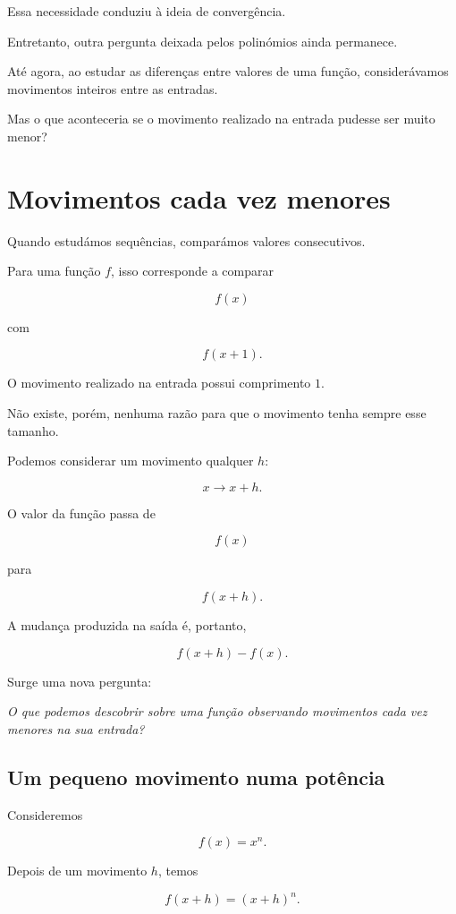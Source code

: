 \documentclass[12pt,a4paper]{article}
\begin{document}
Essa necessidade conduziu à ideia de convergência.

Entretanto, outra pergunta deixada pelos polinómios ainda permanece.

Até agora, ao estudar as diferenças entre valores de uma função,
considerávamos movimentos inteiros entre as entradas.

Mas o que aconteceria se o movimento realizado na entrada pudesse ser
muito menor?

\section{Movimentos cada vez menores}

Quando estudámos sequências, comparámos valores consecutivos.

Para uma função \(f\), isso corresponde a comparar

\[
f(x)
\]

com

\[
f(x+1).
\]

O movimento realizado na entrada possui comprimento \(1\).

Não existe, porém, nenhuma razão para que o movimento tenha sempre esse
tamanho.

Podemos considerar um movimento qualquer \(h\):

\[
x\longrightarrow x+h.
\]

O valor da função passa de

\[
f(x)
\]

para

\[
f(x+h).
\]

A mudança produzida na saída é, portanto,

\[
f(x+h)-f(x).
\]

Surge uma nova pergunta:

\begin{center}
\emph{O que podemos descobrir sobre uma função observando movimentos
cada vez menores na sua entrada?}
\end{center}

\subsection{Um pequeno movimento numa potência}

Consideremos

\[
f(x)=x^n.
\]

Depois de um movimento \(h\), temos

\[
f(x+h)=(x+h)^n.
\]
\end{document}
